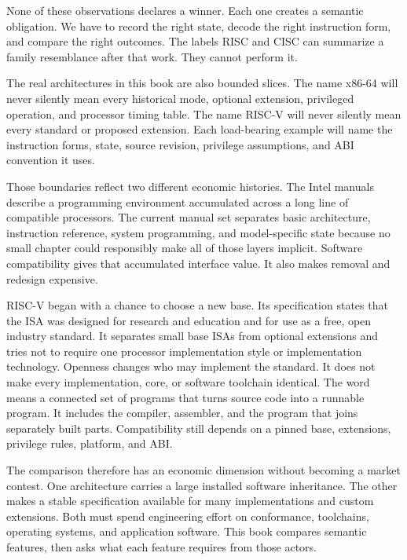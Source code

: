 None of these observations declares a winner. Each one creates a semantic
obligation. We have to record the right state, decode the right instruction
form, and compare the right outcomes. The labels RISC and CISC can summarize a family
resemblance after that work. They cannot perform it.

The real architectures in this book are also bounded slices. The name x86-64 will
never silently mean every historical mode, optional extension, privileged
operation, and processor timing table. The name RISC-V will never silently mean every
standard or proposed extension. Each load-bearing example will name the
instruction forms, state, source revision, privilege assumptions, and ABI
convention it uses.

Those boundaries reflect two different economic histories. The Intel manuals
describe a programming environment accumulated across a long line of
compatible processors. The current manual set separates basic architecture,
instruction reference, system programming, and model-specific state because
no small chapter could responsibly make all of those layers implicit.
\autocite{intel2026sdm1,intel2026sdm2} Software compatibility gives that
accumulated interface value. It also makes removal and redesign expensive.

RISC-V began with a chance to choose a new base. Its specification states that
the ISA was designed for research and education and for use as a free, open
industry standard. It separates small base ISAs from optional extensions and
tries not to require one processor implementation style or implementation
technology.\autocite{riscv2026unpriv} Openness changes who may implement the
standard. It does not make every implementation, core, or software toolchain
identical. The word  means a connected set of programs that
turns source code into a runnable program. It includes the compiler, assembler, and
the program that joins separately built parts. Compatibility still depends on
a pinned base, extensions, privilege rules, platform, and ABI.

The comparison therefore has an economic dimension without becoming a market
contest. One architecture carries a large installed software inheritance. The
other makes a stable specification available for many implementations and
custom extensions. Both must spend engineering effort on conformance,
toolchains, operating systems, and application software. This book compares
semantic features, then asks what each feature requires from those actors.


